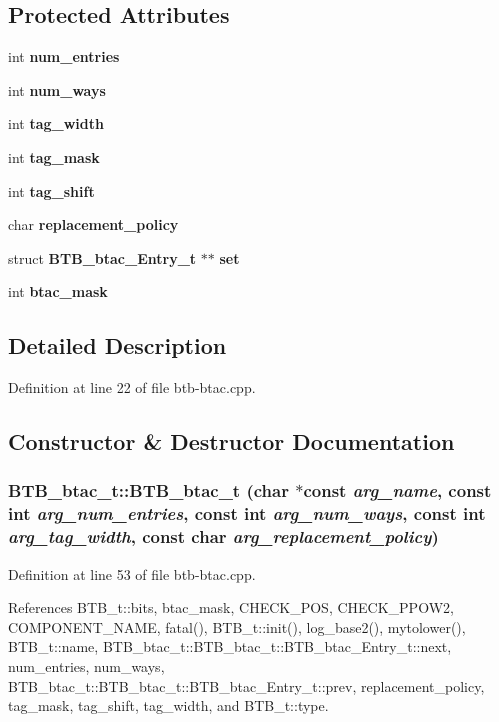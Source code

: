 \subsection*{Protected Attributes}
\begin{CompactItemize}
\item 
int {\bf num\_\-entries}
\item 
int {\bf num\_\-ways}
\item 
int {\bf tag\_\-width}
\item 
int {\bf tag\_\-mask}
\item 
int {\bf tag\_\-shift}
\item 
char {\bf replacement\_\-policy}
\item 
struct {\bf BTB\_\-btac\_\-Entry\_\-t} $\ast$$\ast$ {\bf set}
\item 
int {\bf btac\_\-mask}
\end{CompactItemize}


\subsection{Detailed Description}


Definition at line 22 of file btb-btac.cpp.

\subsection{Constructor \& Destructor Documentation}
\subsubsection[{BTB\_\-btac\_\-t}]{\setlength{\rightskip}{0pt plus 5cm}BTB\_\-btac\_\-t::BTB\_\-btac\_\-t (char $\ast$const  {\em arg\_\-name}, \/  const int {\em arg\_\-num\_\-entries}, \/  const int {\em arg\_\-num\_\-ways}, \/  const int {\em arg\_\-tag\_\-width}, \/  const char {\em arg\_\-replacement\_\-policy})\hspace{0.3cm}{\tt  [inline]}}\label{classBTB__btac__t_755509512947df4573ba72ae340e85a5}




Definition at line 53 of file btb-btac.cpp.

References BTB\_\-t::bits, btac\_\-mask, CHECK\_\-POS, CHECK\_\-PPOW2, COMPONENT\_\-NAME, fatal(), BTB\_\-t::init(), log\_\-base2(), mytolower(), BTB\_\-t::name, BTB\_\-btac\_\-t::BTB\_\-btac\_\-t::BTB\_\-btac\_\-Entry\_\-t::next, num\_\-entries, num\_\-ways, BTB\_\-btac\_\-t::BTB\_\-btac\_\-t::BTB\_\-btac\_\-Entry\_\-t::prev, replacement\_\-policy, tag\_\-mask, tag\_\-shift, tag\_\-width, and BTB\_\-t::type.
